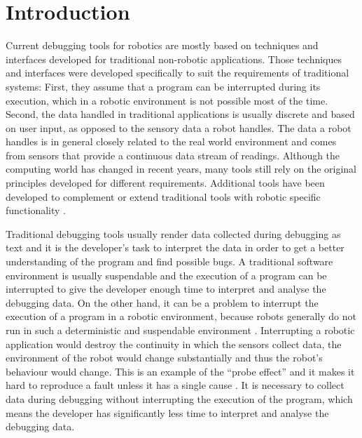\chapter{Introduction}


Current debugging tools for robotics are mostly based on techniques and interfaces developed for traditional non-robotic applications. Those techniques and interfaces were developed specifically to suit the requirements of traditional systems: First, they assume that a program can be interrupted during its execution, which in a robotic environment is not possible most of the time. Second, the data handled in traditional applications is usually discrete and based on user input, as opposed to the sensory data a robot handles. The data a robot handles is in general closely related to the real world environment and comes from sensors that provide a continuous data stream of readings. Although the computing world has changed in recent years, many tools still rely on the original principles developed for different requirements. Additional tools have been developed to complement or extend traditional tools with robotic specific functionality \cite{Gumbley2010}. %


Traditional debugging tools usually render data collected during debugging as text and it is the developer's task to interpret the data in order to get a better understanding of the program and find possible bugs. A traditional software environment is usually suspendable and the execution of a program can be interrupted to give the developer enough time to interpret and analyse the debugging data.
On the other hand, it can be a problem to interrupt the execution of a program in a robotic environment, because robots generally do not run in such a deterministic and suspendable environment \cite{Gumbley2009}. Interrupting a robotic application would destroy the continuity in which the sensors collect data, the environment of the robot would change substantially and thus the robot's behaviour would change. This is an example of the ``probe effect'' and it makes it hard to reproduce a fault unless it has a single cause \cite{Gumbley2009}. It is necessary to collect data during debugging without interrupting the execution of the program, which means the developer has significantly less time to interpret and analyse the debugging data.

